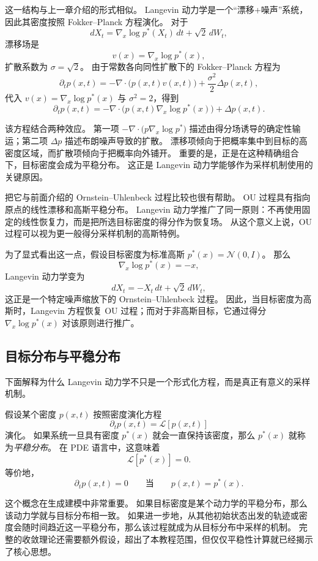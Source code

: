 这一结构与上一章介绍的形式相似。
Langevin 动力学是一个“漂移+噪声”系统，因此其密度按照 Fokker--Planck 方程演化。
对于
\[
dX_t
=
\nabla_x \log p^\ast(X_t)\,dt
+
\sqrt{2}\,dW_t,
\]
漂移场是
\[
v(x)=\nabla_x \log p^\ast(x),
\]
扩散系数为 $\sigma=\sqrt{2}$。
由于常数各向同性扩散下的 Fokker--Planck 方程为
\[
\partial_t p(x,t)
=
-\nabla\cdot\bigl(p(x,t)v(x,t)\bigr)
+
\frac{\sigma^2}{2}\Delta p(x,t),
\]
代入 $v(x)=\nabla_x\log p^\ast(x)$ 与 $\sigma^2=2$，得到
\[
\boxed{
\partial_t p(x,t)
=
-\nabla\cdot\bigl(p(x,t)\nabla_x \log p^\ast(x)\bigr)
+
\Delta p(x,t).
}
\]

该方程结合两种效应。
第一项
$-\nabla\cdot\bigl(p\nabla_x \log p^\ast\bigr)$
描述由得分场诱导的确定性输运；第二项 $\Delta p$ 描述布朗噪声导致的扩散。
漂移项倾向于把概率集中到目标的高密度区域，而扩散项倾向于把概率向外铺开。
重要的是，正是在这种精确组合下，目标密度会成为平稳分布。
这正是 Langevin 动力学能够作为采样机制使用的关键原因。

把它与前面介绍的 Ornstein--Uhlenbeck 过程比较也很有帮助。
OU 过程具有指向原点的线性漂移和高斯平稳分布。
Langevin 动力学推广了同一原则：不再使用固定的线性恢复力，而是把所选目标密度的得分作为恢复场。
从这个意义上说，OU 过程可以视为更一般得分采样机制的高斯特例。

为了显式看出这一点，假设目标密度为标准高斯
$p^\ast(x)=\mathcal{N}(0,I)$。
那么
\[
\nabla_x\log p^\ast(x)=-x,
\]
Langevin 动力学变为
\[
dX_t=-X_t\,dt+\sqrt{2}\,dW_t,
\]
这正是一个特定噪声缩放下的 Ornstein--Uhlenbeck 过程。
因此，当目标密度为高斯时，Langevin 方程恢复 OU 过程；而对于非高斯目标，它通过得分
$\nabla_x\log p^\ast(x)$ 对该原则进行推广。

\subsection{目标分布与平稳分布}

下面解释为什么 Langevin 动力学不只是一个形式化方程，而是真正有意义的采样机制。

假设某个密度 $p(x,t)$ 按照密度演化方程
\[
\partial_t p(x,t)
=
\mathcal{L}[p(x,t)]
\]
演化。
如果系统一旦具有密度 $p^\ast(x)$ 就会一直保持该密度，那么 $p^\ast(x)$ 就称为\emph{平稳分布}。
在 PDE 语言中，这意味着
\[
\mathcal{L}[p^\ast(x)]=0.
\]
等价地，
\[
\partial_t p(x,t)=0
\qquad
\text{当}
\qquad
p(x,t)=p^\ast(x).
\]

这个概念在生成建模中非常重要。
如果目标密度是某个动力学的平稳分布，那么该动力学就与目标分布相一致。
如果进一步地，从其他初始状态出发的轨迹或密度会随时间趋近这一平稳分布，那么该过程就成为从目标分布中采样的机制。
完整的收敛理论还需要额外假设，超出了本教程范围，但仅仅平稳性计算就已经揭示了核心思想。

